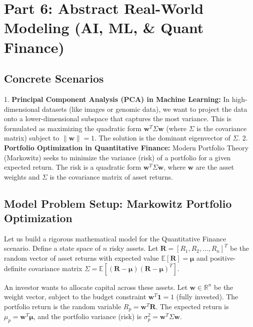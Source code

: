 \documentclass[11pt, letterpaper]{article}
\theoremstyle{definition}
\theoremstyle{remark}
\newcommand{\R}{\mathbb{R}}
\newcommand{\E}{\mathbb{E}}
\begin{document}
\newpage

\section{Part 6: Abstract Real-World Modeling (AI, ML, \& Quant Finance)}

\subsection{Concrete Scenarios}
1. \textbf{Principal Component Analysis (PCA) in Machine Learning:} In high-dimensional datasets (like images or genomic data), we want to project the data onto a lower-dimensional subspace that captures the most variance. This is formulated as maximizing the quadratic form $\mathbf{w}^T \Sigma \mathbf{w}$ (where $\Sigma$ is the covariance matrix) subject to $\|\mathbf{w}\| = 1$. The solution is the dominant eigenvector of $\Sigma$.
2. \textbf{Portfolio Optimization in Quantitative Finance:} Modern Portfolio Theory (Markowitz) seeks to minimize the variance (risk) of a portfolio for a given expected return. The risk is a quadratic form $\mathbf{w}^T \Sigma \mathbf{w}$, where $\mathbf{w}$ are the asset weights and $\Sigma$ is the covariance matrix of asset returns.

\subsection{Model Problem Setup: Markowitz Portfolio Optimization}
Let us build a rigorous mathematical model for the Quantitative Finance scenario.
Define a state space of $n$ risky assets. Let $\mathbf{R} = [R_1, R_2, \dots, R_n]^T$ be the random vector of asset returns with expected value $\E[\mathbf{R}] = \boldsymbol{\mu}$ and positive-definite covariance matrix $\Sigma = \E[(\mathbf{R} - \boldsymbol{\mu})(\mathbf{R} - \boldsymbol{\mu})^T]$.

An investor wants to allocate capital across these assets. Let $\mathbf{w} \in \R^n$ be the weight vector, subject to the budget constraint $\mathbf{w}^T \mathbf{1} = 1$ (fully invested). The portfolio return is the random variable $R_p = \mathbf{w}^T \mathbf{R}$.
The expected return is $\mu_p = \mathbf{w}^T \boldsymbol{\mu}$, and the portfolio variance (risk) is $\sigma_p^2 = \mathbf{w}^T \Sigma \mathbf{w}$.
\end{document}
